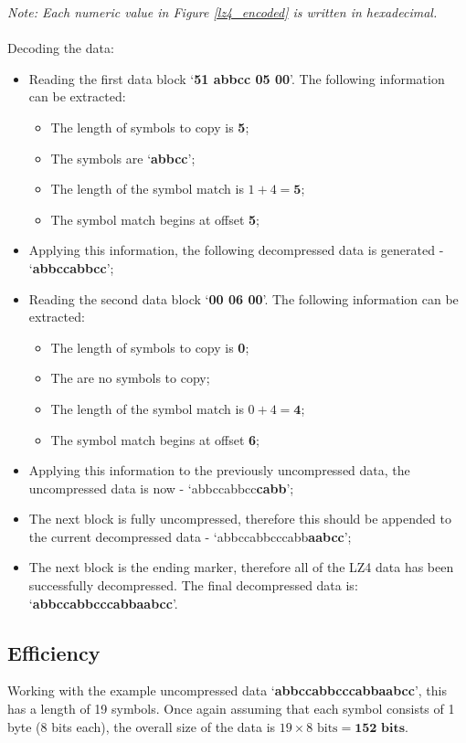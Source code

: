 \documentclass[12pt]{article}
\begin{document}
\emph{Note: Each numeric value in Figure \ref{lz4_encoded} is written in hexadecimal.}
\\\\
Decoding the data:
\begin{itemize}
	\item Reading the first data block `\textbf{51 abbcc 05 00}'. The following information can be extracted:
		\begin{itemize}
			\item The length of symbols to copy is \textbf{5};
			\item The symbols are `\textbf{abbcc}';
			\item The length of the symbol match is $1+4=\textbf{5}$;
			\item The symbol match begins at offset \textbf{5};
		\end{itemize}
	\item Applying this information, the following decompressed data is generated - `\textbf{abbccabbcc}';
	\item Reading the second data block `\textbf{00 06 00}'. The following information can be extracted:
		\begin{itemize}
			\item The length of symbols to copy is \textbf{0};
			\item The are no symbols to copy;
			\item The length of the symbol match is $0+4=\textbf{4}$;
			\item The symbol match begins at offset \textbf{6};
		\end{itemize}
	\item Applying this information to the previously uncompressed data, the uncompressed data is now - `abbccabbcc\textbf{cabb}';
	\item The next block is fully uncompressed, therefore this should be appended to the current decompressed data - `abbccabbcccabb\textbf{aabcc}';
	\item The next block is the ending marker, therefore all of the LZ4 data has been successfully decompressed. The final decompressed data is: `\textbf{abbccabbcccabbaabcc}'.
\end{itemize}

\subsection{Efficiency}
Working with the example uncompressed data `\textbf{abbccabbcccabbaabcc}', this has a length of 19 symbols. Once again assuming that each symbol consists of 1 byte (8 bits each), the overall size of the data is $19\times8\text{ bits}=\textbf{152 bits}$.
\end{document}
